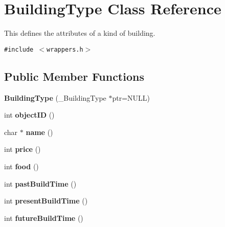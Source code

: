 \hypertarget{classBuildingType}{
\section{BuildingType Class Reference}
\label{classBuildingType}
}
This defines the attributes of a kind of building.  


{\tt \#include $<$wrappers.h$>$}

\subsection*{Public Member Functions}
\begin{CompactItemize}
\item 
\hypertarget{classBuildingType_4f4b34cfe4ee8e45f0e65f6c5d4e7bb9}{
\textbf{BuildingType} (\_\-BuildingType $\ast$ptr=NULL)}
\label{classBuildingType_4f4b34cfe4ee8e45f0e65f6c5d4e7bb9}

\item 
\hypertarget{classBuildingType_e2e3b4a71736772db226889edeede525}{
int \textbf{objectID} ()}
\label{classBuildingType_e2e3b4a71736772db226889edeede525}

\item 
\hypertarget{classBuildingType_14b04f6191efd64754733064cc71c39f}{
char $\ast$ \textbf{name} ()}
\label{classBuildingType_14b04f6191efd64754733064cc71c39f}

\item 
\hypertarget{classBuildingType_56adb396d8a4a08af404261964250048}{
int \textbf{price} ()}
\label{classBuildingType_56adb396d8a4a08af404261964250048}

\item 
\hypertarget{classBuildingType_b619bcf2b8101453d041aaa3a518fbd9}{
int \textbf{food} ()}
\label{classBuildingType_b619bcf2b8101453d041aaa3a518fbd9}

\item 
\hypertarget{classBuildingType_2c41c74ad0d129c0c041d1b1d4eee23f}{
int \textbf{pastBuildTime} ()}
\label{classBuildingType_2c41c74ad0d129c0c041d1b1d4eee23f}

\item 
\hypertarget{classBuildingType_28124b76e664f95241113f2763b8465a}{
int \textbf{presentBuildTime} ()}
\label{classBuildingType_28124b76e664f95241113f2763b8465a}

\item 
\hypertarget{classBuildingType_2be0cff4241c3db8131ddabb1af105ef}{
int \textbf{futureBuildTime} ()}
\label{classBuildingType_2be0cff4241c3db8131ddabb1af105ef}


\end{CompactItemize}
